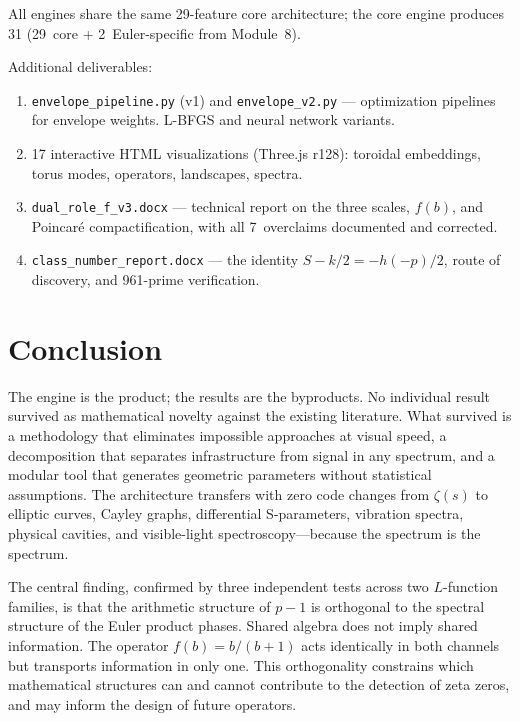 \documentclass[11pt]{amsart}
\begin{document}
All engines share the same 29-feature core architecture; the core engine
produces 31 (29~core + 2~Euler-specific from Module~8).

Additional deliverables:
\begin{enumerate}[resume,label=(\alph*)]
\item \texttt{envelope\_pipeline.py} (v1) and \texttt{envelope\_v2.py} ---
  optimization pipelines for envelope weights. L-BFGS and neural network
  variants.
\item 17 interactive HTML visualizations (Three.js r128): toroidal
  embeddings, torus modes, operators, landscapes, spectra.
\item \texttt{dual\_role\_f\_v3.docx} --- technical report on the three
  scales, $f(b)$, and Poincar\'e compactification, with all 7~overclaims
  documented and corrected.
\item \texttt{class\_number\_report.docx} --- the identity
  $S - k/2 = -h(-p)/2$, route of discovery, and 961-prime verification.
\end{enumerate}


\section{Conclusion}
\label{sec:conclusion}

The engine is the product; the results are the byproducts. No individual
result survived as mathematical novelty against the existing literature. What
survived is a methodology that eliminates impossible approaches at visual
speed, a decomposition that separates infrastructure from signal in any
spectrum, and a modular tool that generates geometric parameters without
statistical assumptions. The architecture transfers with zero code changes
from $\zeta(s)$ to elliptic curves, Cayley graphs, differential
S-parameters, vibration spectra, physical cavities, and visible-light
spectroscopy---because the spectrum is the spectrum.

The central finding, confirmed by three independent tests across two
$L$-function families, is that the arithmetic structure of $p-1$ is
orthogonal to the spectral structure of the Euler product phases. Shared
algebra does not imply shared information. The operator
$f(b) = b/(b+1)$ acts identically in both channels but transports
information in only one. This orthogonality constrains which mathematical
structures can and cannot contribute to the detection of zeta zeros, and may
inform the design of future operators.
\end{document}
